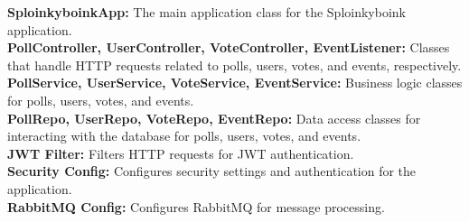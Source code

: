 \vspace{1cm}

\noindent
\textbf{SploinkyboinkApp:} The main application class for the Sploinkyboink application.\\
\textbf{PollController, UserController, VoteController, EventListener:} Classes that handle HTTP requests related to polls, users, votes, and events, respectively.\\
\textbf{PollService, UserService, VoteService, EventService:} Business logic classes for polls, users, votes, and events.\\
\textbf{PollRepo, UserRepo, VoteRepo, EventRepo:} Data access classes for interacting with the database for polls, users, votes, and events.\\
\textbf{JWT Filter:} Filters HTTP requests for JWT authentication.\\
\textbf{Security Config:} Configures security settings and authentication for the application.\\
\textbf{RabbitMQ Config:} Configures RabbitMQ for message processing.


